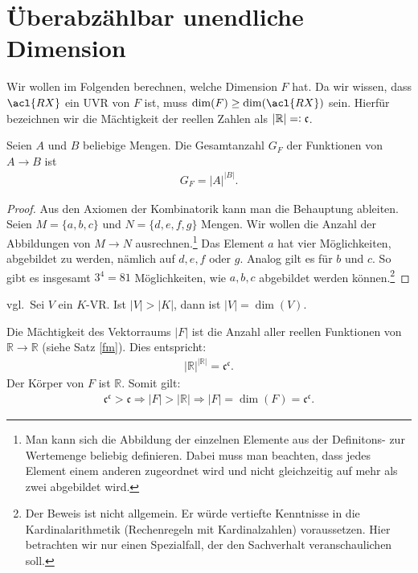 \section{Überabzählbar unendliche Dimension}
Wir wollen im Folgenden berechnen, welche Dimension $F$ hat. Da wir wissen, dass $\acl{RX}$ ein \acl{UVR} von $F$ ist, muss $\dim(F)\geq\dim(\acl{RX})$ sein. Hierfür bezeichnen wir die Mächtigkeit der reellen Zahlen als $|\mathbb{R}|=\vcentcolon\mathfrak{c}$.

\begin{Lemma} \label{fm} Seien $A$ und $B$ beliebige Mengen. Die Gesamtanzahl $G_F$ der Funktionen von $A \rightarrow B$ ist 
\begin{align*}
G_F= |A|^{|B|}.
\end{align*}
\end{Lemma} 

\begin{proof}
Aus den Axiomen der Kombinatorik kann man die Behauptung ableiten.
Seien $M=\{a,b,c\}$ und {$N=\{d,e,f,g\}$} Mengen. Wir wollen die Anzahl der Abbildungen von $M \rightarrow N$ ausrechnen.\footnote{Man kann sich die Abbildung der einzelnen Elemente aus der Definitons- zur Wertemenge beliebig definieren. Dabei muss man beachten, dass jedes Element einem anderen zugeordnet wird und nicht gleichzeitig auf mehr als zwei abgebildet wird.} Das Element $a$ hat vier Möglichkeiten, abgebildet zu werden, nämlich auf $d,e,f$ oder $g$. Analog gilt es für $b$ und $c$. So gibt es insgesamt $3^4=81$ Möglichkeiten, wie $a,b,c$ abgebildet werden können.\footnote{Der Beweis ist nicht allgemein. Er würde vertiefte Kenntnisse in die Kardinalarithmetik (Rechenregeln mit Kardinalzahlen) voraussetzen. Hier betrachten wir nur einen Spezialfall, der den Sachverhalt veranschaulichen soll.}
\end{proof}

\begin{Satz}vgl.\,\cite[S. 3, 3.2 (a)]{Card}\label{dim}
Sei $V$ ein $K$-\acl{VR}. Ist $|V|>|K|$, dann ist $|V|=\dim(V)$.
\end{Satz}

\begin{Corollar}
Die Mächtigkeit des Vektorraums $|F|$ ist die Anzahl aller reellen Funktionen von $\mathbb{R}\rightarrow\mathbb{R}$ (siehe Satz \ref{fm}). Dies entspricht:
\begin{align*}
|\mathbb{R}|^{|\mathbb{R}|}= \mathfrak {c}^{\mathfrak {c}} \text{.}  
\end{align*} 
Der Körper von $F$ ist $\mathbb{R}$. Somit gilt: 
\begin{align*}\mathfrak {c}^{\mathfrak {c}} > \mathfrak {c} \Rightarrow |F|>|\mathbb{R}|  \Rightarrow |F|=\dim(F)=\mathfrak {c}^{\mathfrak {c}}\text{.} \end{align*}
\end{Corollar}














